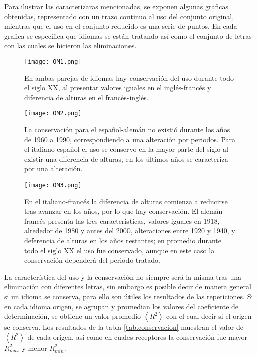Para ilustrar las caracterizaras mencionadas, se exponen algunas graficas obtenidas, representado con un trazo continuo al uso del conjunto original, mientras que el uso en el conjunto reducido  es una serie de puntos. En cada grafica se especifica que idiomas se están tratando así como el conjunto de letras con las cuales se hicieron las eliminaciones. 

\clearpage

\begin{figure}[h!]
	\centering
	\texttt{[image: OM1.png]}
	\label{fig.OM1}
	\caption{En ambas parejas de idiomas hay conservación del uso durante todo el siglo XX, al presentar valores iguales en el inglés-francés y  diferencia de alturas en el francés-inglés.}
\end{figure}


\begin{figure}[h!]
	\centering
	\texttt{[image: OM2.png]}
	\label{fig.OM2}
	\caption{La conservación para el español-alemán no existió durante los años de 1960 a 1990,  correspondiendo a una alteración por periodos. Para el italiano-español el uso se conservo  en la mayor parte del siglo al existir una diferencia de alturas, en los últimos años se caracteriza por una alteración.}
\end{figure}

\clearpage
\begin{figure}[h!]
	\centering
	\texttt{[image: OM3.png]}
	\label{fig.OM3}
	\caption{ En el italiano-francés la diferencia de alturas comienza a reducirse tras avanzar en los años, por lo que hay conservación. El alemán-francés  presenta las tres características,  valores iguales  en 1918, alrededor de 1980 y antes del 2000,  alteraciones entre 1920 y 1940, y deferencia de alturas  en los años restantes; en promedio durante todo el siglo XX el uso fue conservado, aunque en este caso la conservación dependerá del periodo tratado.}
\end{figure}




La característica del uso y la conservación no siempre será la misma tras una eliminación con diferentes letras, sin embargo es posible decir de manera general si un idioma se conserva, para ello son útiles los resultados de las repeticiones. Si en cada idioma origen, se agrupan y promedian los valores del coeficiente de determinación,  se obtiene un valor promedio $\left \langle R^{2}  \right \rangle$ con el cual decir si el origen se conserva.  Los resultados de la tabla \ref{tab.conservacion} muestran el valor de  $\left \langle R^{2} \right \rangle$ de cada origen,  así como en cuales receptores la conservación fue mayor $R^{2}_{max}$ y  menor $R^{2}_{min}$.





